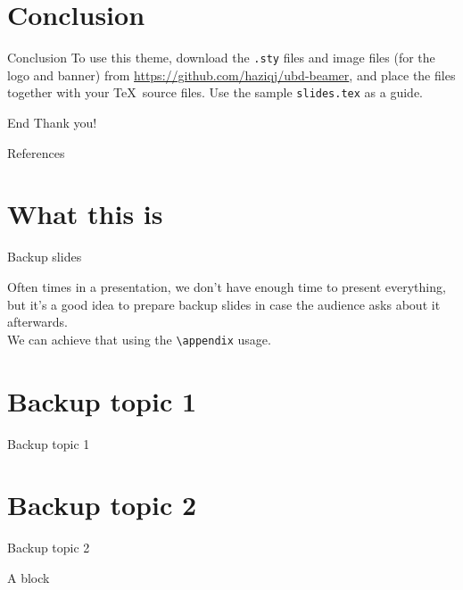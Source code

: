 \documentclass[]{beamer}
\begin{document}
\section{Conclusion}

\begin{frame}{Conclusion}
	To use this theme, download the \texttt{.sty} files and image files (for the logo and banner) from \url{https://github.com/haziqj/ubd-beamer}, and place the files together with your \TeX~source files. Use the sample \texttt{slides.tex} as a guide.
\end{frame}

\begin{frame}{End}
	\centering
	\Huge Thank you!
\end{frame}

\begin{frame}{References}
	\printbibliography[heading=none]
\end{frame}

\appendix
\backupbegin

\section{What this is}

\begin{frame}{Backup slides}

	Often times in a presentation, we don't have enough time to present everything, but it's a good idea to prepare backup slides in case the audience asks about it afterwards.\\[1em]
	
	We can achieve that using the \texttt{\textbackslash appendix} usage.
	
\end{frame}

\section{Backup topic 1}

\begin{frame}{Backup topic 1}

	\lipsum[1]
	
\end{frame}

\section{Backup topic 2}

\begin{frame}{Backup topic 2}

	\begin{block}{A block}
		\lipsum[4]
	\end{block}

\end{frame}

\backupend
\end{document}

